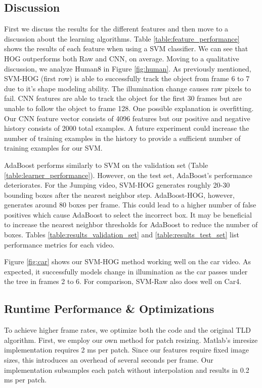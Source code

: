 \documentclass[10pt,twocolumn,letterpaper]{article}
\begin{document}
\subsection{Discussion}

First we discuss the results for the different features and then move to a discussion about the learning algorithms. Table \ref{table:feature_performance} shows the results of each feature when using a SVM classifier. We can see that HOG outperforms both Raw and CNN, on average. Moving to a qualitative discussion, we analyze Human8 in Figure \ref{fig:human}. As previously mentioned, SVM-HOG (first row) is able to successfully track the object from frame 6 to 7 due to it's shape modeling ability. The illumination change causes raw pixels to fail. CNN features are able to track the object for the first 30 frames but are unable to follow the object to frame 128. One possible explanation is overfitting. Our CNN feature vector consists of 4096 features but our positive and negative history consists of 2000 total examples. A future experiment could increase the number of training examples in the history to provide a sufficient number of training examples for our SVM.

AdaBoost performs similarly to SVM on the validation set (Table \ref{table:learner_performance}). However, on the test set, AdaBoost's performance deteriorates. For the Jumping video, SVM-HOG generates roughly 20-30 bounding boxes after the nearest neighbor step. AdaBoost-HOG, however, generates around 80 boxes per frame. This could lead to a higher number of false positives which cause AdaBoost to select the incorrect box. It may be beneficial to increase the nearest neighbor thresholds for AdaBoost to reduce the number of boxes. Tables \ref{table:results_validation_set} and \ref{table:results_test_set} list performance metrics for each video.

Figure \ref{fig:car} shows our SVM-HOG method working well on the car video. As expected, it successfully models change in illumination as the car passes under the tree in frames 2 to 6. For comparison, SVM-Raw also does well on Car4.

\subsection{Runtime Performance \& Optimizations}

To achieve higher frame rates, we optimize both the code and the original TLD algorithm. First, we employ our own method for patch resizing. Matlab's imresize implementation requires 2 ms per patch. Since our features require fixed image sizes, this introduces an overhead of several seconds per frame. Our implementation subsamples each patch without interpolation and results in 0.2 ms per patch.
\end{document}
